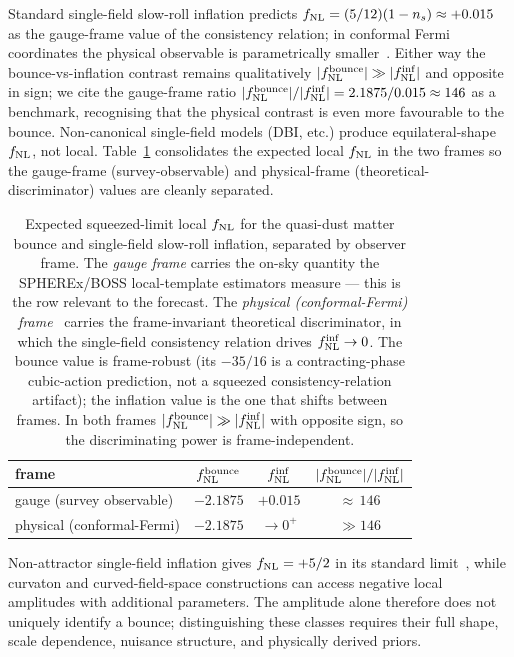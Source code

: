 \documentclass[aps,prd,twocolumn,superscriptaddress,showpacs,preprintnumbers,nofootinbib,longbibliography,floatfix]{revtex4-2}
\newcommand{\fnl}{f_{\rm NL}}
\begin{document}
Standard single-field slow-roll inflation predicts $\fnl = (5/12)(1-n_s) \approx +0.015$~\cite{Maldacena:2002vr} as the gauge-frame value of the consistency relation; in conformal Fermi coordinates the physical observable is parametrically smaller~\cite{Pajer:2013,TanakaUrakawa:2011}. Either way the bounce-vs-inflation contrast remains qualitatively $|\fnl^{\rm bounce}| \gg |\fnl^{\rm inf}|$ and opposite in sign; we cite the gauge-frame ratio $|\fnl^{\rm bounce}|/|\fnl^{\rm inf}| = 2.1875/0.015 \approx 146$ as a benchmark, recognising that the physical contrast is even more favourable to the bounce. Non-canonical single-field models (DBI, etc.) produce equilateral-shape $\fnl$, not local. Table~\ref{tab:frames} consolidates the expected local $\fnl$ in the two frames so the gauge-frame (survey-observable) and physical-frame (theoretical-discriminator) values are cleanly separated.
\begin{table}[h]
\centering
\caption{\label{tab:frames}Expected squeezed-limit local $\fnl$ for the quasi-dust matter bounce and single-field slow-roll inflation, separated by observer frame. The \emph{gauge frame} carries the on-sky quantity the SPHEREx/BOSS local-template estimators measure --- this is the row relevant to the forecast. The \emph{physical (conformal-Fermi) frame}~\cite{Pajer:2013,TanakaUrakawa:2011} carries the frame-invariant theoretical discriminator, in which the single-field consistency relation drives $\fnl^{\rm inf}\to0$. The bounce value is frame-robust (its $-35/16$ is a contracting-phase cubic-action prediction, not a squeezed consistency-relation artifact); the inflation value is the one that shifts between frames. In both frames $|\fnl^{\rm bounce}|\gg|\fnl^{\rm inf}|$ with opposite sign, so the discriminating power is frame-independent.}
\begin{ruledtabular}
\begin{tabular}{lccc}
frame & $\fnl^{\rm bounce}$ & $\fnl^{\rm inf}$ & $|\fnl^{\rm bounce}|/|\fnl^{\rm inf}|$ \\ \hline
gauge (survey observable) & $-2.1875$ & $+0.015$ & ${\approx}\,146$ \\
physical (conformal-Fermi) & $-2.1875$ & $\to 0^{+}$ & $\gg 146$ \\
\end{tabular}
\end{ruledtabular}
\end{table}

Non-attractor single-field inflation gives $\fnl=+5/2$ in its standard limit~\cite{Cai:2018non}, while curvaton and curved-field-space constructions can access negative local amplitudes with additional parameters. The amplitude alone therefore does not uniquely identify a bounce; distinguishing these classes requires their full shape, scale dependence, nuisance structure, and physically derived priors.
\end{document}
